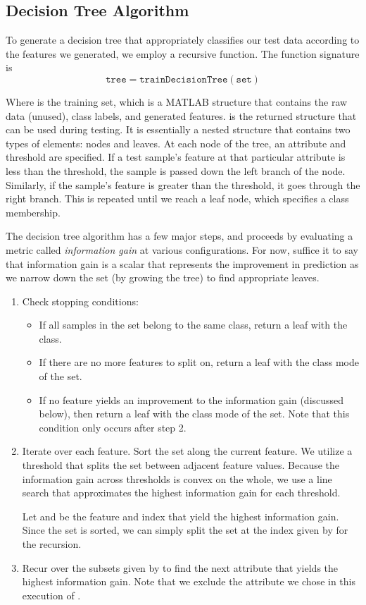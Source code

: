 \subsection{Decision Tree Algorithm}

To generate a decision tree that appropriately classifies our test data according to the features we generated, we employ a recursive function. The function signature is
%
\begin{equation*}
  \mathtt{tree = trainDecisionTree(set)}
\end{equation*}

Where  is the training set, which is a MATLAB structure that contains the raw data (unused), class labels, and generated features.  is the returned structure that can be used during testing. It is essentially a nested structure that contains two types of elements: nodes and leaves. At each node of the tree, an attribute and threshold are specified. If a test sample's feature at that particular attribute is less than the threshold, the sample is passed down the left branch of the node. Similarly, if the sample's feature is greater than the threshold, it goes through the right branch. This is repeated until we reach a leaf node, which specifies a class membership. 

The decision tree algorithm has a few major steps, and proceeds by evaluating a metric called \emph{information gain} at various configurations. For now, suffice it to say that information gain is a scalar that represents the improvement in prediction as we narrow down the set (by growing the tree) to find appropriate leaves.
%
\begin{enumerate}
\item Check stopping conditions:
%
  \begin{itemize}
  \item If all samples in the set belong to the same class, return a leaf with the class.
  \item If there are no more features to split on, return a leaf with the class mode of the set. 
  \item If no feature yields an improvement to the information gain (discussed below), then return a leaf with the class mode of the set. Note that this condition only occurs after step 2. 
  \end{itemize}
\item Iterate over each feature. Sort the set along the current feature. We utilize a threshold that splits the set between adjacent feature values. Because the information gain across thresholds is convex on the whole, we use a line search that approximates the highest information gain for each threshold. 

  Let  and  be the feature and index that yield the highest information gain. Since the set is sorted, we can simply split the set at the index given by  for the recursion.
\item Recur over the subsets given by  to find the next attribute that yields the highest information gain. Note that we exclude the attribute we chose in this execution of .
\end{enumerate}

